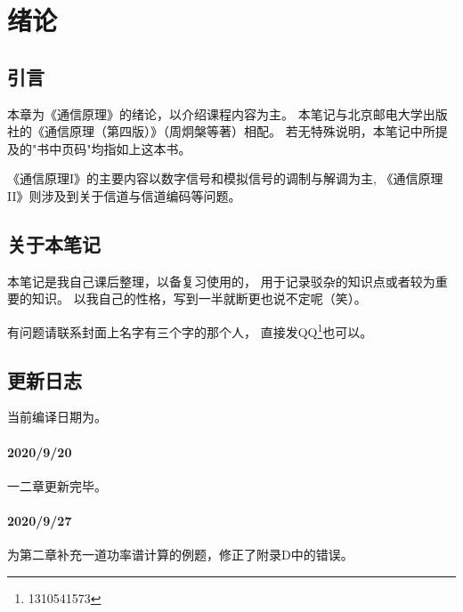 \section{绪论}
\subsection{引言}
    本章为《通信原理》的绪论，以介绍课程内容为主。
    本笔记与北京邮电大学出版社的《通信原理（第四版）》（周炯槃等著）相配。
    若无特殊说明，本笔记中所提及的"书中页码"均指如上这本书。

    《通信原理I》的主要内容以数字信号和模拟信号的调制与解调为主,
    《通信原理II》则涉及到关于信道与信道编码等问题。

\subsection{关于本笔记}
    本笔记是我自己课后整理，以备复习使用的，
    用于记录驳杂的知识点或者较为重要的知识。
    以我自己的性格，写到一半就断更也说不定呢（笑）。

    有问题请联系封面上名字有三个字的那个人，
    直接发QQ\footnote{1310541573}也可以。

\subsection{更新日志}
    当前编译日期为。
    \paragraph{2020/9/20}一二章更新完毕。
    \paragraph{2020/9/27}为第二章补充一道功率谱计算的例题，修正了附录D中的错误。